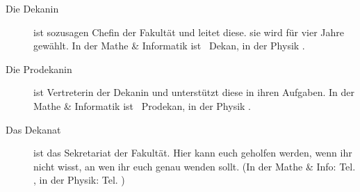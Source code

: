 \begin{description}
%
%
%
%
%
%
%

\item[Die Dekanin] ist sozusagen Chefin der Fakultät und leitet diese. sie wird für vier Jahre gewählt. In der Mathe \& Informatik ist \dekanmathelang\ Dekan, in der Physik \dekanphysiklang .

\item[Die Prodekanin] ist Vertreterin der Dekanin und unterstützt diese in ihren Aufgaben. In der Mathe \& Informatik ist \prodekanmathe\ Prodekan, in der Physik \prodekanphysik .

\item[Das Dekanat] ist das Sekretariat der Fakultät. Hier kann euch geholfen werden, wenn ihr nicht wisst, an wen ihr euch genau wenden sollt. (In der Mathe \& Info: Tel.  \dekanatmathetelefon , in der Physik: Tel. \dekanatphysiktelefon )


\end{description}
